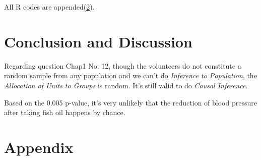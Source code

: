\documentclass[a4paper,10pt]{article}
\begin{document}
All R codes are appended(\ref{appendix}).

\section{Conclusion and Discussion}
Regarding question Chap1 No. 12, though the volunteers do not constitute a random sample from any population and we can't do \emph{Inference to Population}, the \emph{Allocation of Units to Groups} is random. It's still valid to do \emph{Causal Inference}.

Based on the 0.005 p-value, it's very unlikely that the reduction of blood pressure after taking fish oil happens by chance.

\section{Appendix}
\label{appendix}
\end{document}
